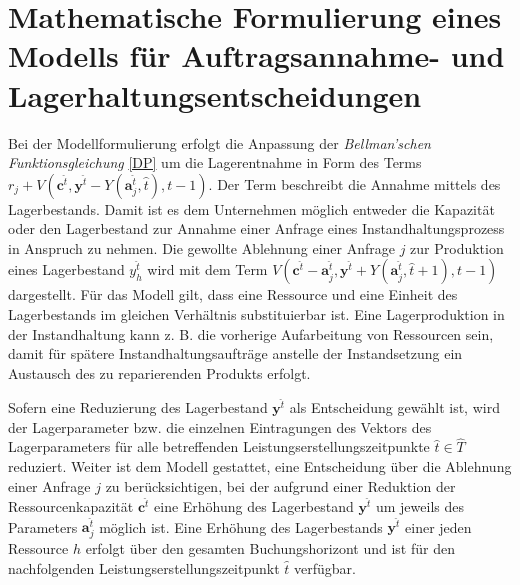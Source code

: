 \section{Mathematische Formulierung eines Modells für Auftragsannahme- und Lagerhaltungsentscheidungen}\label{Umformung}

Bei der Modellformulierung erfolgt die Anpassung der \textit{Bellman'schen Funktionsgleichung}  \eqref{DP} um die Lagerentnahme in Form des Terms $r_{j} + V(\textbf{c}^{\hat t}, \textbf{y}^{\hat t}-Y(\textbf{a}_j^{\hat t}, \hat t), t-1)$. Der Term beschreibt die Annahme mittels des Lagerbestands. Damit ist es dem Unternehmen möglich entweder die Kapazität oder den Lagerbestand zur Annahme einer Anfrage eines Instandhaltungsprozess in Anspruch zu nehmen. Die gewollte Ablehnung einer Anfrage $j$ zur Produktion eines Lagerbestand $y_h^{\hat t}$ wird mit dem Term $V(\textbf{c}^{\hat t}-\textbf{a}^{\hat t}_j, \textbf{y}^{\hat t}+Y(\textbf{a}^{\hat t}_j, \hat t +1), t-1)$ dargestellt. Für das Modell gilt, dass eine Ressource und eine Einheit des Lagerbestands im gleichen Verhältnis substituierbar ist. Eine Lagerproduktion in der Instandhaltung kann z. B. die vorherige Aufarbeitung von Ressourcen sein, damit für spätere Instandhaltungsaufträge anstelle der Instandsetzung ein Austausch des zu reparierenden Produkts erfolgt.

Sofern eine Reduzierung des Lagerbestand $\textbf{y}^{\hat t}$ als Entscheidung gewählt ist, wird der Lagerparameter bzw. die einzelnen Eintragungen des Vektors des Lagerparameters für alle betreffenden Leistungserstellungszeitpunkte $\hat t\in \hat T$ reduziert. Weiter ist dem Modell gestattet, eine Entscheidung über die Ablehnung einer Anfrage $j$ zu berücksichtigen, bei der aufgrund einer Reduktion der Ressourcenkapazität $\textbf{c}^{\hat t}$ eine Erhöhung des Lagerbestand $\textbf{y}^{\hat t}$ um jeweils des Parameters $\textbf{a}_j^{\hat t}$ möglich ist. Eine Erhöhung des Lagerbestands $\textbf{y}^{\hat t}$ einer jeden Ressource $h$ erfolgt über den gesamten Buchungshorizont und ist für den nachfolgenden Leistungserstellungszeitpunkt $\hat t$ verfügbar. %


